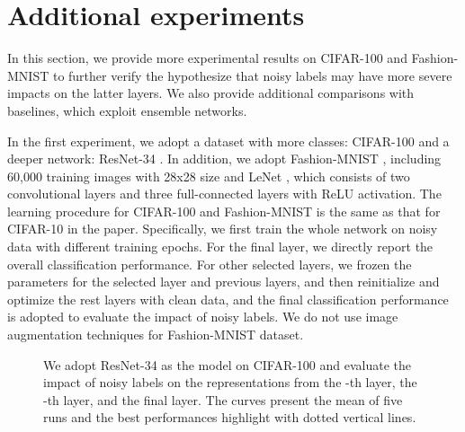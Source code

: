 \documentclass[11pt]{article}
\begin{document}
\begin{table}[!ht]
\centering
\caption{Semi loss weight  for CIFAR-10 and CIFAR-100}
\label{tab:lambda_u}
\end{table}

\section{Additional experiments}
In this section, we provide more experimental results on CIFAR-100 and Fashion-MNIST to further verify the hypothesize that noisy labels may have more severe impacts on the latter layers. We also provide additional comparisons with baselines, which exploit ensemble networks.

In the first experiment, we adopt a dataset with more classes: CIFAR-100 and a deeper network: ResNet-34 \cite{He2016ResNet}. In addition, we adopt Fashion-MNIST \cite{Xiao2017Fashion}, including 60,000 training images with 28x28 size and LeNet \cite{Cun1989Handwritten}, which consists of two convolutional layers and three full-connected layers with ReLU activation. The learning procedure for CIFAR-100 and Fashion-MNIST is the same as that for CIFAR-10 in the paper. Specifically, we first train the whole network on noisy data with different training epochs. For the final layer, we directly report the overall classification performance. For other selected layers, we frozen the parameters for the selected layer and previous layers, and then reinitialize and optimize the rest layers with clean data, and the final classification performance is adopted to evaluate the impact of noisy labels. We do not use image augmentation techniques for Fashion-MNIST dataset.

\begin{figure}[!ht]
\vspace{-10pt}
\centering
{}
\caption{We adopt ResNet-34 as the model on CIFAR-100 and evaluate the impact of noisy labels on the representations from the -th layer, the -th layer, and the final layer. The curves present the mean of five runs and the
best performances highlight with dotted vertical lines.}
\label{fig:4}
\vspace{-10pt}
\end{figure}
\end{document}
